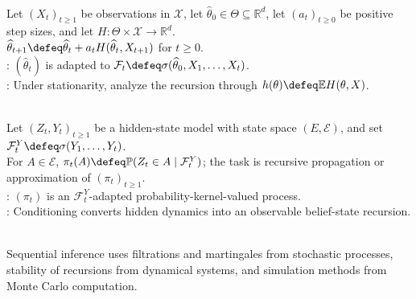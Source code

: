 \begin{definition} \label{def:online-estimator-recursion} \\
Let $(X_t)_{t\geq1}$ be observations in $\mathcal{X}$, let $\widehat{\theta}_0\in\Theta\subseteq\mathbb{R}^d$, let $(a_t)_{t\geq0}$ be positive step sizes, and let $H:\Theta\times\mathcal{X}\to\mathbb{R}^d$.\\
$\widehat{\theta}_{t+1}\defeq\widehat{\theta}_t+a_tH(\widehat{\theta}_t,X_{t+1})$ for $t\geq0$.\\
: $(\widehat{\theta}_t)$ is adapted to $\mathcal{F}_t\defeq\sigma(\widehat{\theta}_0,X_1,\ldots,X_t)$.\\
: Under stationarity, analyze the recursion through $h(\theta)\defeq\mathbb{E}H(\theta,X)$.
\end{definition}

\begin{definition} \label{def:filtering-problem} \\
Let $(Z_t,Y_t)_{t\geq1}$ be a hidden-state model with state space $(E,\mathcal{E})$, and set $\mathcal{F}_t^Y\defeq\sigma(Y_1,\ldots,Y_t)$.\\
For $A\in\mathcal{E}$, $\pi_t(A)\defeq\mathbb{P}(Z_t\in A\mid\mathcal{F}_t^Y)$; the task is recursive propagation or approximation of $(\pi_t)_{t\geq1}$.\\
: $(\pi_t)$ is an $\mathcal{F}_t^Y$-adapted probability-kernel-valued process.\\
: Conditioning converts hidden dynamics into an observable belief-state recursion.
\end{definition}

\begin{remark} \label{rem:sequential-cross-references} \\
Sequential inference uses filtrations and martingales from stochastic processes, stability of recursions from dynamical systems, and simulation methods from Monte Carlo computation.
\end{remark}

